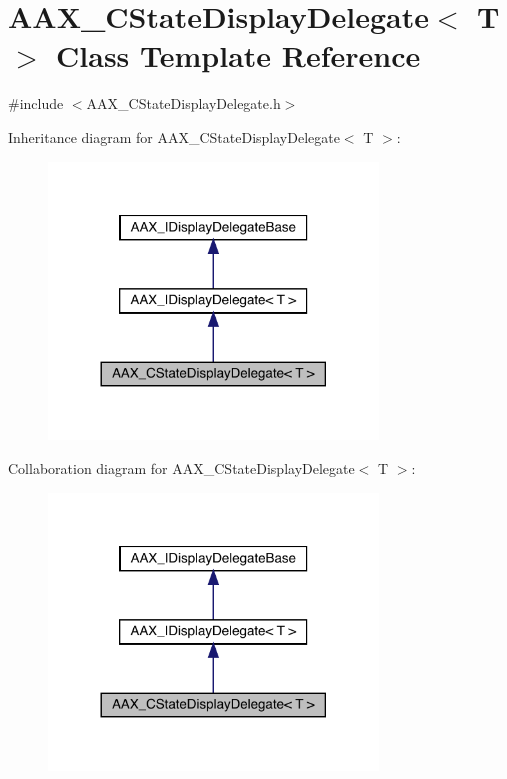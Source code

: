 \hypertarget{a01561}{}\section{A\+A\+X\+\_\+\+C\+State\+Display\+Delegate$<$ T $>$ Class Template Reference}
\label{a01561}


{\ttfamily \#include $<$A\+A\+X\+\_\+\+C\+State\+Display\+Delegate.\+h$>$}



Inheritance diagram for A\+A\+X\+\_\+\+C\+State\+Display\+Delegate$<$ T $>$\+:
\nopagebreak
\begin{figure}[H]
\begin{center}
\leavevmode
\includegraphics[width=248pt]{a01560}
\end{center}
\end{figure}


Collaboration diagram for A\+A\+X\+\_\+\+C\+State\+Display\+Delegate$<$ T $>$\+:
\nopagebreak
\begin{figure}[H]
\begin{center}
\leavevmode
\includegraphics[width=248pt]{a01559}
\end{center}
\end{figure}



